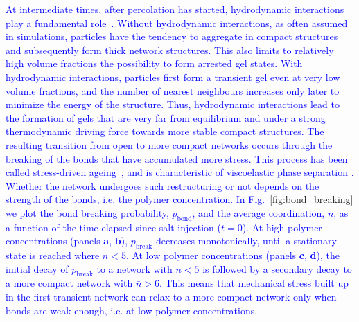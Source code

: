 \documentclass[preprint,amsmath,amssymb,superscriptaddress]{revtex4-1}
\begin{document}
\textcolor{blue}
{
At intermediate times, after percolation has started, hydrodynamic interactions play a fundamental role~\cite{tanaka2000,tanaka2007spontaneous,furukawa2010key}.
Without hydrodynamic interactions, as often assumed in simulations, particles have the tendency to aggregate in compact structures and subsequently form thick network structures. This also limits to relatively high volume fractions the possibility to form arrested gel states. 
With hydrodynamic interactions, particles first form a transient gel even at very low volume fractions, and the number of nearest neighbours increases only later to minimize the energy of the structure. Thus, hydrodynamic interactions lead to the formation of gels that are very far from equilibrium and under a strong thermodynamic driving force towards more stable compact structures. The resulting transition from open to more compact networks occurs through the breaking of the bonds that have accumulated more stress. This process has been called stress-driven ageing~\cite{tanaka2007spontaneous}, and is characteristic of viscoelastic phase separation \cite{tanaka2000viscoelastic}. Whether the network undergoes such restructuring or not depends on the strength of the bonds, i.e. the polymer concentration.
In Fig.~\ref{fig:bond_breaking} we plot the bond breaking probability, $p_\text{bond}$, and the average coordination, $\bar{n}$, as a function of the time elapsed since salt injection ($t=0$).
At high polymer concentrations (panels \textbf{a}, \textbf{b}), $p_\text{break}$ decreases monotonically, until a stationary state is reached where $\bar{n}<5$.
At low polymer concentrations (panels \textbf{c}, \textbf{d}), the initial decay of $p_\text{break}$ to a network with $\bar{n}<5$ is followed by a secondary decay to a more compact network with $\bar{n}>6$. This means that mechanical stress built up in the first transient network can relax to a more compact network only when bonds are weak enough, i.e. at low polymer concentrations.
}
\end{document}
